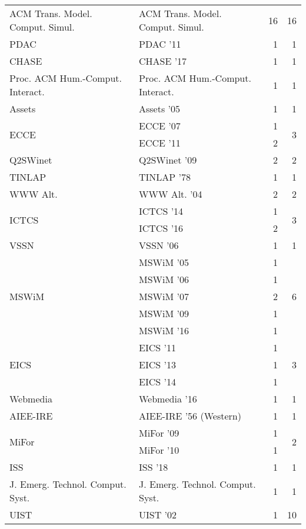 \begin{table*}[t]
\begin{tabular}{llrr}
\multirow{1}{*}{ACM Trans. Model. Comput. Simul.} & ACM Trans. Model. Comput. Simul. & 16 & \multirow{1}{*}{16}\\
\multirow{1}{*}{PDAC } & PDAC '11 & 1 & \multirow{1}{*}{1}\\
\multirow{1}{*}{CHASE } & CHASE '17 & 1 & \multirow{1}{*}{1}\\
\multirow{1}{*}{Proc. ACM Hum.-Comput. Interact.} & Proc. ACM Hum.-Comput. Interact. & 1 & \multirow{1}{*}{1}\\
\multirow{1}{*}{Assets } & Assets '05 & 1 & \multirow{1}{*}{1}\\
\multirow{2}{*}{ECCE } & ECCE '07 & 1 & \multirow{2}{*}{3}\\
& ECCE '11 & 2 &\\
\multirow{1}{*}{Q2SWinet } & Q2SWinet '09 & 2 & \multirow{1}{*}{2}\\
\multirow{1}{*}{TINLAP } & TINLAP '78 & 1 & \multirow{1}{*}{1}\\
\multirow{1}{*}{WWW Alt. } & WWW Alt. '04 & 2 & \multirow{1}{*}{2}\\
\multirow{2}{*}{ICTCS } & ICTCS '14 & 1 & \multirow{2}{*}{3}\\
& ICTCS '16 & 2 &\\
\multirow{1}{*}{VSSN } & VSSN '06 & 1 & \multirow{1}{*}{1}\\
\multirow{5}{*}{MSWiM } & MSWiM '05 & 1 & \multirow{5}{*}{6}\\
& MSWiM '06 & 1 &\\
& MSWiM '07 & 2 &\\
& MSWiM '09 & 1 &\\
& MSWiM '16 & 1 &\\
\multirow{3}{*}{EICS } & EICS '11 & 1 & \multirow{3}{*}{3}\\
& EICS '13 & 1 &\\
& EICS '14 & 1 &\\
\multirow{1}{*}{Webmedia } & Webmedia '16 & 1 & \multirow{1}{*}{1}\\
\multirow{1}{*}{AIEE-IRE } & AIEE-IRE '56 (Western) & 1 & \multirow{1}{*}{1}\\
\multirow{2}{*}{MiFor } & MiFor '09 & 1 & \multirow{2}{*}{2}\\
& MiFor '10 & 1 &\\
\multirow{1}{*}{ISS } & ISS '18 & 1 & \multirow{1}{*}{1}\\
\multirow{1}{*}{J. Emerg. Technol. Comput. Syst.} & J. Emerg. Technol. Comput. Syst. & 1 & \multirow{1}{*}{1}\\
\multirow{6}{*}{UIST } & UIST '02 & 1 & \multirow{6}{*}{10}\\

\end{tabular}
\end{table*}
